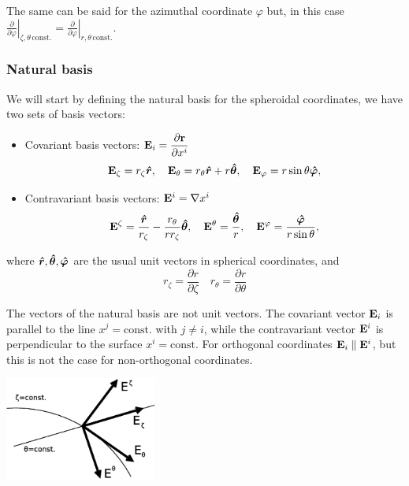 The same can be said for the azimuthal coordinate $\varphi$ but, in this case
$\left.\frac{\partial}{\partial\varphi}\right|_{\zeta,\theta\,\mathrm{const.}}=
\left.\frac{\partial}{\partial\varphi}\right|_{r,\theta\,\mathrm{const.}}$.

\subsubsection{Natural basis}

We will start by defining the natural basis for the spheroidal coordinates, we have two sets of basis vectors:
\begin{itemize}
\item Covariant basis vectors: $\displaystyle\mathbf{E}_i=\frac{\partial\mathbf{r}}
{\partial x^i}$
\begin{equation}
\mathbf{E}_\zeta=r_\zeta\boldsymbol{\hat r}, \quad
\mathbf{E}_\theta=r_\theta\boldsymbol{\hat r}+r\boldsymbol{\hat \theta}, \quad
\mathbf{E}_\varphi=r\sin\theta\boldsymbol{\hat \varphi},
\end{equation}
\item Contravariant basis vectors: $\mathbf{E}^i=\nabla x^i$
\begin{equation}
\mathbf{E}^\zeta=\frac{\boldsymbol{\hat r}}{r_\zeta}-\frac{r_\theta}{rr_\zeta}\boldsymbol{\hat \theta}, \quad
\mathbf{E}^\theta=\frac{\boldsymbol{\hat \theta}}{r},\quad
\mathbf{E}^{\varphi}=\frac{\boldsymbol{\hat \varphi}}{r\sin\theta},
\end{equation}
\end{itemize}
\noindent where $\boldsymbol{\hat r},\boldsymbol{\hat \theta},\boldsymbol{\hat \varphi}$ are the usual unit vectors in spherical coordinates, and
$$r_\zeta=\frac{\partial r}{\partial\zeta}\quad r_\theta=\frac{\partial r}{\partial\theta}$$

The vectors of the natural basis are not unit vectors. The covariant vector $\mathbf{E}_i$ is parallel to 
the line $x^j=\mathrm{const.}$ with $j\ne i$, while the contravariant vector $\mathbf{E}^i$ is 
perpendicular to the surface $x^i=\mathrm{const.}$ For orthogonal coordinates $\mathbf{E}_i\parallel\mathbf{E}^i$, but
this is not the case for non-orthogonal coordinates.

\begin{center}
\includegraphics[width=5cm]{fig/vectors.eps}
\end{center}

